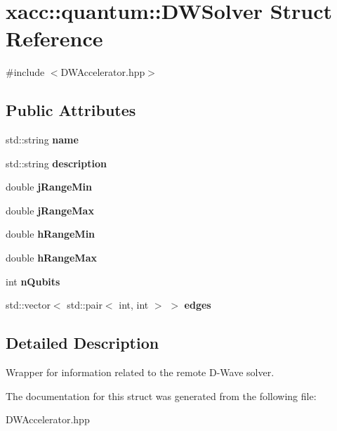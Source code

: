 \hypertarget{a00035}{}\section{xacc\+:\+:quantum\+:\+:D\+W\+Solver Struct Reference}
\label{a00035}


{\ttfamily \#include $<$D\+W\+Accelerator.\+hpp$>$}

\subsection*{Public Attributes}
\begin{DoxyCompactItemize}
\item 
std\+::string {\bfseries name}\hypertarget{a00035_a8a5b629dc83790a855d429c82266b772}{}\label{a00035_a8a5b629dc83790a855d429c82266b772}

\item 
std\+::string {\bfseries description}\hypertarget{a00035_a9bb9449a6ea09e11892f910a4bfd2e08}{}\label{a00035_a9bb9449a6ea09e11892f910a4bfd2e08}

\item 
double {\bfseries j\+Range\+Min}\hypertarget{a00035_a45fc23af53f44759afec0257d9878ba0}{}\label{a00035_a45fc23af53f44759afec0257d9878ba0}

\item 
double {\bfseries j\+Range\+Max}\hypertarget{a00035_aa881af1344ff55a4991c152f768ed9d6}{}\label{a00035_aa881af1344ff55a4991c152f768ed9d6}

\item 
double {\bfseries h\+Range\+Min}\hypertarget{a00035_abf475612dac8f64a7f88cfa976c393f0}{}\label{a00035_abf475612dac8f64a7f88cfa976c393f0}

\item 
double {\bfseries h\+Range\+Max}\hypertarget{a00035_a13dd875ceb06c7545fe20cde15ffac70}{}\label{a00035_a13dd875ceb06c7545fe20cde15ffac70}

\item 
int {\bfseries n\+Qubits}\hypertarget{a00035_a2908c913f5c5e3ade6551056aaadafbf}{}\label{a00035_a2908c913f5c5e3ade6551056aaadafbf}

\item 
std\+::vector$<$ std\+::pair$<$ int, int $>$ $>$ {\bfseries edges}\hypertarget{a00035_ae02cbfe68c982e50e80bcd2612c8c148}{}\label{a00035_ae02cbfe68c982e50e80bcd2612c8c148}

\end{DoxyCompactItemize}


\subsection{Detailed Description}
Wrapper for information related to the remote D-\/\+Wave solver. 

The documentation for this struct was generated from the following file\+:\begin{DoxyCompactItemize}
\item 
D\+W\+Accelerator.\+hpp\end{DoxyCompactItemize}

